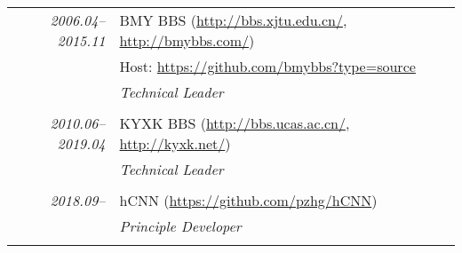 \documentclass[paper=a4,fontsize=11pt]{scrartcl}
\begin{document}
\begin{tabular}{r|p{11cm}}
	\emph{2006.04--2015.11} & BMY BBS (\href{http://bbs.xjtu.edu.cn/}{http://bbs.xjtu.edu.cn/}, \href{http://bmybbs.com/}{http://bmybbs.com/}) \\
	& Host: \href{https://github.com/bmybbs?type=source}{https://github.com/bmybbs?type=source} \\
	& \emph{Technical Leader} \\ 
	\multicolumn{2}{c}{} \\
	
	\emph{2010.06--2019.04} & KYXK BBS (\href{http://bbs.ucas.ac.cn/}{http://bbs.ucas.ac.cn/}, \href{http://kyxk.net/}{http://kyxk.net/}) \\
	& \emph{Technical Leader} \\ 
	\multicolumn{2}{c}{} \\
	
	\emph{2018.09--} & hCNN (\href{https://github.com/pzhg/hCNN}{https://github.com/pzhg/hCNN}) \\
	& \emph{Principle Developer} \\ 
	\multicolumn{2}{c}{}
\end{tabular}



%
%
%
\end{document}
